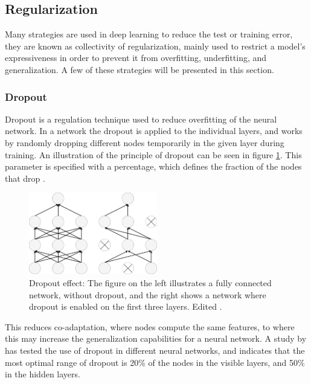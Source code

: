 

\subsection{Regularization}
Many strategies are used in deep learning to reduce the test or training error, they are known as collectivity of regularization\citep{Goodfellow2016}, mainly used to restrict a model's expressiveness in order to prevent it from overfitting, underfitting, and generalization. A few of these strategies will be presented in this section.

\subsubsection{Dropout}\label{sec:dropout}
Dropout is a regulation technique used to reduce overfitting of the neural network. In a network the dropout is applied to the individual layers, and works by randomly dropping different nodes temporarily in the given layer during training. An illustration of the principle of dropout can be seen in figure \ref{fig:Dropout}. This parameter is specified with a percentage, which defines the fraction of the nodes that drop \citep{Chollet2015}.

\begin{figure} [H]
\centering
\includegraphics[width=0.5\textwidth]{figures/Dropout}
\caption{Dropout effect: The figure on the left illustrates a fully connected network, without dropout, and the right shows a network where dropout is enabled on the first three layers. Edited \citep{Srivastava2014}.}
\label{fig:Dropout} 
\end{figure}

\noindent
This reduces co-adaptation, where nodes compute the same features, to where this may increase the generalization capabilities for a neural network. 
A study by \citeauthor{Srivastava2014} \citep{Srivastava2014} has tested the use of dropout in different neural networks, and indicates that the most optimal range of dropout is 20\% of the nodes in the visible layers, and 50\% in the hidden layers.\citep{Srivastava2014}

